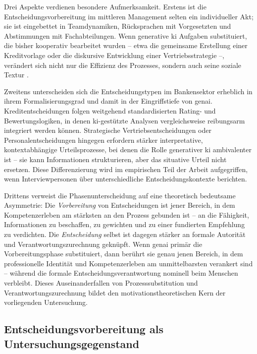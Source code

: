 \label{tab:genai-entscheidung}

Drei Aspekte verdienen besondere Aufmerksamkeit. Erstens ist die Entscheidungsvorbereitung im mittleren Management selten ein individueller Akt; sie ist eingebettet in Teamdynamiken, Rücksprachen mit Vorgesetzten und Abstimmungen mit Fachabteilungen. Wenn generative \gls{ki} Aufgaben substituiert, die bisher kooperativ bearbeitet wurden -- etwa die gemeinsame Erstellung einer Kreditvorlage oder die diskursive Entwicklung einer Vertriebsstrategie --, verändert sich nicht nur die Effizienz des Prozesses, sondern auch seine soziale Textur \parencite{klonekDoesAIWork2025}.

Zweitens unterscheiden sich die Entscheidungstypen im Bankensektor erheblich in ihrem Formalisierungsgrad und damit in der Eingriffstiefe von \gls{genai}. Kreditentscheidungen folgen weitgehend standardisierten Rating- und Bewertungslogiken, in denen \acrshort{ki}-gestützte Analysen vergleichsweise reibungsarm integriert werden können. Strategische Vertriebsentscheidungen oder Personalentscheidungen hingegen erfordern stärker interpretative, kontextabhängige Urteilsprozesse, bei denen die Rolle generativer \gls{ki} ambivalenter ist -- sie kann Informationen strukturieren, aber das situative Urteil nicht ersetzen. Diese Differenzierung wird im empirischen Teil der Arbeit aufgegriffen, wenn Interviewpersonen über unterschiedliche Entscheidungskontexte berichten.

Drittens verweist die Phasenunterscheidung auf eine theoretisch bedeutsame Asymmetrie: Die \textit{Vorbereitung} von Entscheidungen ist jener Bereich, in dem Kompetenzerleben am stärksten an den Prozess gebunden ist -- an die Fähigkeit, Informationen zu beschaffen, zu gewichten und zu einer fundierten Empfehlung zu verdichten. Die \textit{Entscheidung} selbst ist dagegen stärker an formale Autorität und Verantwortungszurechnung geknüpft. Wenn \gls{genai} primär die Vorbereitungsphase substituiert, dann berührt sie genau jenen Bereich, in dem professionelle Identität und Kompetenzerleben am unmittelbarsten verankert sind -- während die formale Entscheidungsverantwortung nominell beim Menschen verbleibt. Dieses Auseinanderfallen von Prozesssubstitution und Verantwortungszurechnung bildet den motivationstheoretischen Kern der vorliegenden Untersuchung.


\subsection{Entscheidungsvorbereitung als Untersuchungsgegenstand}
\label{subsec:entscheidungsvorbereitung}

